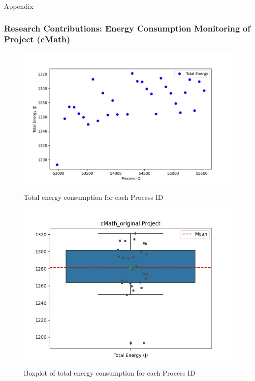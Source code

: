 \documentclass{beamer}
\begin{document}
\begin{frame}{Appendix}
\label{appendix}
\hypertarget{Energy_Consumption_cMath}{}
  \frametitle{Research Contributions: Energy Consumption Monitoring of Project (cMath)}
  
  \vspace*{-.8cm} %
  
  \begin{figure}[t]
    \begin{minipage}[t]{0.55\textwidth}
        \raggedright
        \includegraphics[width=\textwidth]{figures/cMath_project_energy.jpeg}
        \captionsetup{singlelinecheck=false, justification=centering}
        \caption{\small Total energy consumption for each Process ID}
        \label{fig:Total energy consumption for each Process ID}
    \end{minipage}\hfill
    \begin{minipage}[t]{0.45\textwidth}
        \raggedleft
        \includegraphics[width=\textwidth]{figures/cMath_project_energy_boxplot.jpeg}
        \captionsetup{singlelinecheck=false, justification=centering}
        \captionsetup{justification=centering} %
        \caption{\small Boxplot of  total energy consumption for each Process ID}
        \label{fig:Boxplot of  total energy consumption for each Process ID}
    \end{minipage}
\end{figure}


\end{frame}
\end{document}
